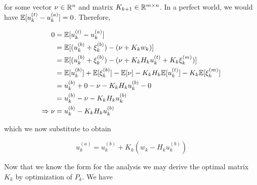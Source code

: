 for some vector $\nu\in\mathbb{R}^n$ and matrix $K_{k+1}\in\mathbb{R}^{m\times n}$. In a perfect world, we would have $\mathbb{E}[u_{k}^{(t)}-u_{k}^{(a)}] = 0$. Therefore,

\begin{align}
    0 &= \mathbb{E}[u_k^{(t)} - u_k^{(a)}] \\
    &= \mathbb{E}[(u_k^{(b)} + \xi_k^{(b)}) - (\nu + K_kw_k)] \\
    &= \mathbb{E}[(u_k^{(b)} + \xi_k^{(b)}) - (\nu + K_kH_ku_k^{(t)} + K_k\xi_k^{(m)})] \\
    &= \mathbb{E}[u_k^{(b)}] + \mathbb{E}[\xi_k^{(b)}] - \mathbb{E}[\nu] -K_kH_k\mathbb{E}[u_k^{(t)}] - K_k\mathbb{E}[\xi_k^{(m)}]\\
    &= u_k^{(b)} + 0 - \nu - K_kH_ku_k^{(b)} - 0 \\
    &= u_k^{(b)} - \nu - K_kH_ku_k^{(b)} \\
    \Rightarrow \nu &= u_k^{(b)} - K_kH_ku_k^{(b)}
\end{align}

which we now substitute to obtain

\begin{equation}
    \boxed{u_k^{(a)} = u_k^{(b)} + K_k(w_k - H_ku_k^{(b)})}
\end{equation}

Now that we know the form for the analysis we may derive the optimal matrix $K_k$ by optimization of $P_k$. We have

